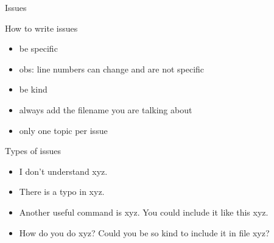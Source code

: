 \begin{frame}{Issues}

How to write issues

\begin{itemize}
 \item be specific
 \item obs: line numbers can change and are not specific
 \item be kind
 \item always add the filename you are talking about
 \item only one topic per issue
\end{itemize}

Types of issues

\begin{itemize}
 \item I don't understand xyz.
 \item There is a typo in xyz.
 \item Another useful command is xyz. You could include it like this xyz.
 \item How do you do xyz? Could you be so kind to include it in file xyz?
\end{itemize}

\end{frame}
